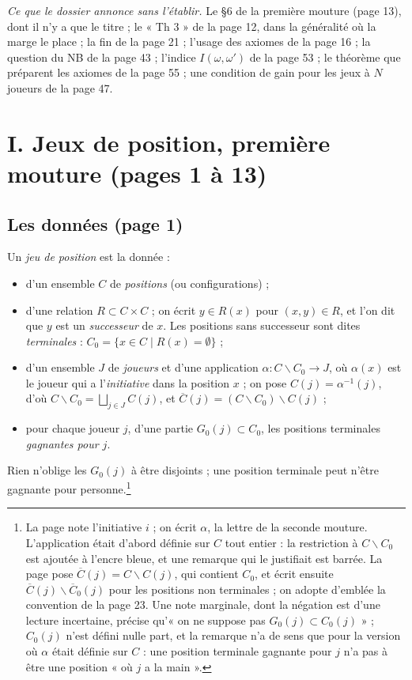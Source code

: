 \documentclass[11pt,a4paper]{article}
\begin{document}
\emph{Ce que le dossier annonce sans l'établir.} Le §6 de la première
mouture (page 13), dont il n'y a que le titre ; le « Th 3 » de la page 12,
dans la généralité où la marge le place ; la fin de la page 21 ; l'usage des
axiomes de la page 16 ; la question du NB de la page 43 ; l'indice
$I(\omega, \omega')$ de la page 53 ; le théorème que préparent les axiomes de
la page 55 ; une condition de gain pour les jeux à $N$ joueurs de la page 47.

\section*{I. Jeux de position, première mouture (pages 1 à 13)}

\subsection*{Les données (page 1)}

Un \emph{jeu de position} est la donnée :
\begin{itemize}
  \item d'un ensemble $C$ de \emph{positions} (ou configurations) ;
  \item d'une relation $R \subset C \times C$ ; on écrit $y \in R(x)$ pour
  $(x, y) \in R$, et l'on dit que $y$ est un \emph{successeur} de $x$. Les
  positions sans successeur sont dites \emph{terminales} :
  $C_0 = \{x \in C \mid R(x) = \emptyset\}$ ;
  \item d'un ensemble $J$ de \emph{joueurs} et d'une application
  $\alpha : C \smallsetminus C_0 \to J$, où $\alpha(x)$ est le joueur qui a
  l'\emph{initiative} dans la position $x$ ; on pose
  $C(j) = \alpha^{-1}(j)$, d'où
  $C \smallsetminus C_0 = \bigsqcup_{j \in J} C(j)$, et
  $\overline{C}(j) = (C \smallsetminus C_0) \smallsetminus C(j)$ ;
  \item pour chaque joueur $j$, d'une partie $G_0(j) \subset C_0$, les
  positions terminales \emph{gagnantes pour $j$}.
\end{itemize}
Rien n'oblige les $G_0(j)$ à être disjoints ; une position terminale peut
n'être gagnante pour personne.\footnote{La page note l'initiative $i$ ; on
écrit $\alpha$, la lettre de la seconde mouture. L'application était d'abord
définie sur $C$ tout entier : la restriction à $C \smallsetminus C_0$ est
ajoutée à l'encre bleue, et une remarque qui le justifiait est barrée. La page
pose $\overline{C}(j) = C \smallsetminus C(j)$, qui contient $C_0$, et écrit
ensuite $\overline{C}(j) \smallsetminus \overline{C}_0(j)$ pour les positions
non terminales ; on adopte d'emblée la convention de la page 23. Une note
marginale, dont la négation est d'une lecture incertaine, précise qu'« on ne
suppose pas $G_0(j) \subset C_0(j)$ » ; $C_0(j)$ n'est défini nulle part, et
la remarque n'a de sens que pour la version où $\alpha$ était définie sur
$C$ : une position terminale gagnante pour $j$ n'a pas à être une position
« où $j$ a la main ».}
\end{document}
